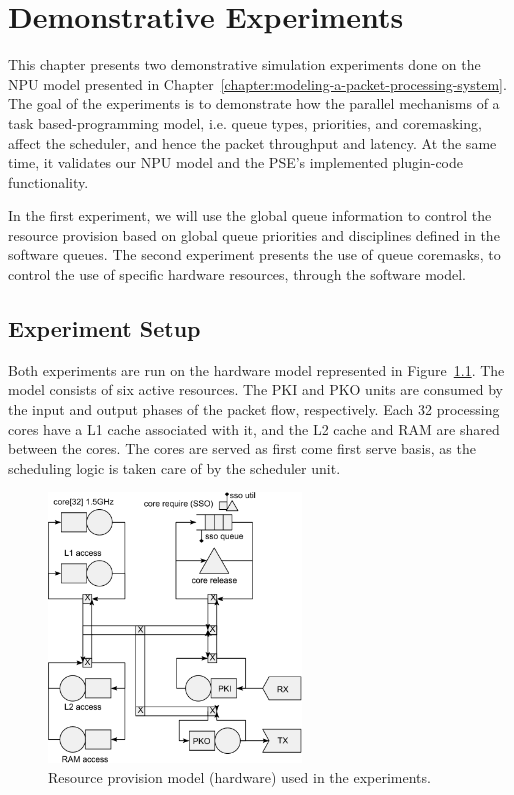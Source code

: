 \chapter{Demonstrative Experiments}
\label{chapter:demonstrative-experiments}

This chapter presents two demonstrative simulation experiments done on the NPU model presented in Chapter~\ref{chapter:modeling-a-packet-processing-system}. The goal of the experiments is to demonstrate how the parallel mechanisms of a task based-programming model, i.e. queue types, priorities, and coremasking, affect the scheduler, and hence the packet throughput and latency. At the same time, it validates our NPU model and the PSE's implemented plugin-code functionality.

In the first experiment, we will use the global queue information to control the resource provision based on global queue priorities and disciplines defined in the software queues. The second experiment presents the use of queue coremasks, to control the use of specific hardware resources, through the software model.

\section{Experiment Setup}
\label{sec:experiment-setup}

Both experiments are run on the hardware model represented in Figure~\ref{fig:experiment-hardware}. The model consists of six active resources. The PKI and PKO units are consumed by the input and output phases of the packet flow, respectively. Each 32 processing cores have a L1 cache associated with it, and the L2 cache and RAM are shared between the cores. The cores are served as first come first serve basis, as the scheduling logic is taken care of by the scheduler unit.

\begin{figure}[]
  \begin{center}
    \includegraphics[width=0.6\textwidth]{images/pse-models/experiment-hardware.pdf}
    \caption{Resource provision model (hardware) used in the experiments.}
    \label{fig:experiment-hardware}
  \end{center}
\end{figure}

